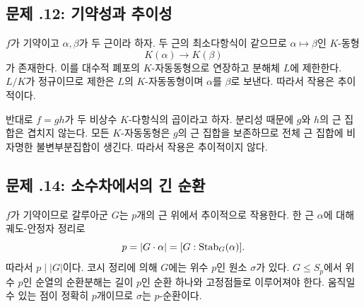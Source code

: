 \subsection*{문제 \thechapter.12: 기약성과 추이성}

\begin{solution}
$f$가 기약이고 $\alpha,\beta$가 두 근이라 하자. 두 근의 최소다항식이 같으므로 $\alpha\mapsto\beta$인 $K$-동형
\[
  K(\alpha)\longrightarrow K(\beta)
\]
가 존재한다. 이를 대수적 폐포의 $K$-자동동형으로 연장하고 분해체 $L$에 제한한다. $L/K$가 정규이므로 제한은 $L$의 $K$-자동동형이며 $\alpha$를 $\beta$로 보낸다. 따라서 작용은 추이적이다.

반대로 $f=gh$가 두 비상수 $K$-다항식의 곱이라고 하자. 분리성 때문에 $g$와 $h$의 근 집합은 겹치지 않는다. 모든 $K$-자동동형은 $g$의 근 집합을 보존하므로 전체 근 집합에 비자명한 불변부분집합이 생긴다. 따라서 작용은 추이적이지 않다.
\end{solution}

\subsection*{문제 \thechapter.14: 소수차에서의 긴 순환}

\begin{solution}
$f$가 기약이므로 갈루아군 $G$는 $p$개의 근 위에서 추이적으로 작용한다. 한 근 $\alpha$에 대해 궤도-안정자 정리로
\[
  p=|G\cdot\alpha|=[G:\operatorname{Stab}_G(\alpha)].
\]
따라서 $p\mid|G|$이다. 코시 정리에 의해 $G$에는 위수 $p$인 원소 $\sigma$가 있다. $G\le S_p$에서 위수 $p$인 순열의 순환분해는 길이 $p$인 순환 하나와 고정점들로 이루어져야 한다. 움직일 수 있는 점이 정확히 $p$개이므로 $\sigma$는 $p$-순환이다.
\end{solution}
